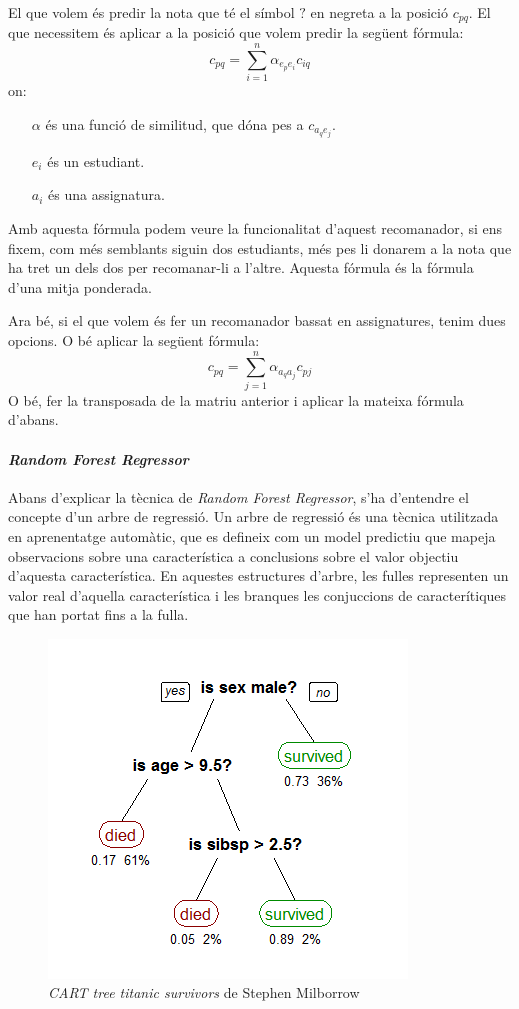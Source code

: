 \documentclass[12pt,a4paper,catalan]{article}
\begin{document}
El que volem és predir la nota que té el símbol $?$ en negreta a la posició $c_{pq}$. El que necessitem és aplicar a la posició que volem predir la següent fórmula:
$$
	c_{pq} = \sum_{i=1}^n{\alpha_{e_pe_i}c_{iq}}
$$
on:
\begin{itemize}[leftmargin=.5in]
	\item [$\alpha$] és una funció de similitud, que dóna pes a $c_{a_qe_j}$.
	\item [$e_i$] és un estudiant.
	\item [$a_i$] és una assignatura.
\end{itemize}

Amb aquesta fórmula podem veure la funcionalitat d'aquest recomanador, si ens fixem, com més semblants siguin dos estudiants, més pes li donarem a la nota que ha tret un dels dos per recomanar-li a l'altre. Aquesta fórmula és la fórmula d'una mitja ponderada.

\newpage

Ara bé, si el que volem és fer un recomanador bassat en assignatures, tenim dues opcions. O bé aplicar la següent fórmula:
$$
	c_{pq} = \sum_{j=1}^n{\alpha_{a_qa_j}c_{pj}}
$$
O bé, fer la transposada de la matriu anterior i aplicar la mateixa fórmula d'abans.

\paragraph{\textit{Random Forest Regressor}}
Abans d'explicar la tècnica de \textit{Random Forest Regressor}, s'ha d'entendre el concepte d'un arbre de regressió. Un arbre de regressió és una tècnica utilitzada en aprenentatge automàtic, que es defineix com un model predictiu que mapeja observacions sobre una característica a conclusions sobre el valor objectiu d'aquesta característica. En aquestes estructures d'arbre, les fulles representen un valor real d'aquella característica i les branques les conjuccions de caracterítiques que han portat fins a la fulla.

\begin{figure}[h]
\centering
\includegraphics[width=.5\linewidth]{img/randomforest.png}
\caption{\textit{CART tree titanic survivors} de Stephen Milborrow}
\end{figure}
\end{document}

